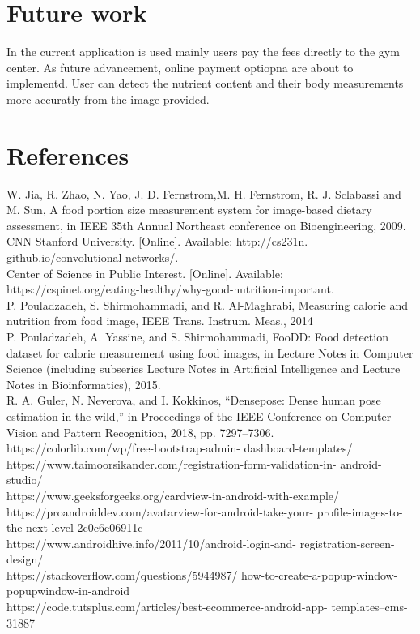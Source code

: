 \documentclass[a4paper,12pt,toc=flat]{report}
\begin{document}
		\section{Future work}
		In the current application  is used mainly users pay the fees directly to the gym center. As future advancement, online payment optiopna are about to implementd. User can detect the nutrient content and their body measurements more accuratly from the image provided.
	
	\pagebreak

	


\section{References}

     \subitem[1]     W. Jia, R. Zhao, N. Yao, J. D. Fernstrom,M.
     H. Fernstrom, R. 
	J. Sclabassi and M. Sun, A food portion size measurement system
	 for image-based dietary assessment, in IEEE 35th Annual Northeast
		conference on Bioengineering, 2009.\\
\subitem[2] CNN Stanford University. [Online]. Available: http://cs231n.
		github.io/convolutional-networks/.\\ 
\subitem	[3] Center of Science in Public Interest. [Online]. Available:
	 https://cspinet.org/eating-healthy/why-good-nutrition-important. \\
	\subitem[4] P. Pouladzadeh, S. Shirmohammadi, and R. Al-Maghrabi, 
		Measuring calorie and nutrition from food image, IEEE Trans. 
		Instrum. Meas., 2014\\
\subitem	[5] P. Pouladzadeh, A. Yassine, and S. Shirmohammadi, FooDD: Food 
	detection dataset for calorie measurement using food images, in 
	Lecture Notes in Computer Science (including subseries Lecture 
	Notes in Artificial  Intelligence and Lecture
Notes in Bioinformatics), 2015.\\
\subitem	[6] R. A. Guler, N. Neverova, and I. Kokkinos, “Densepose: 
	Dense human pose estimation in the wild,” in Proceedings of the IEEE 
	Conference on Computer Vision and Pattern Recognition, 2018,
	 pp. 7297–7306.\\
\subitem	[7] https://colorlib.com/wp/free-bootstrap-admin-
		dashboard-templates/\\
\subitem	[8] https://www.taimoorsikander.com/registration-form-validation-in-
		android-studio/\\
\subitem	[9] https://www.geeksforgeeks.org/cardview-in-android-with-example/\\
\pagebreak
\subitem	[10] https://proandroiddev.com/avatarview-for-android-take-your-
	profile-images-to-the-next-level-2c0c6e06911c\\
\subitem	[11]https://www.androidhive.info/2011/10/android-login-and-
	registration-screen-design/\\
\subitem	[12] https://stackoverflow.com/questions/5944987/
		how-to-create-a-popup-window-popupwindow-in-android\\
	\subitem[13]https://code.tutsplus.com/articles/best-ecommerce-android-app-
		templates--cms-31887\\
	
\end{document}
